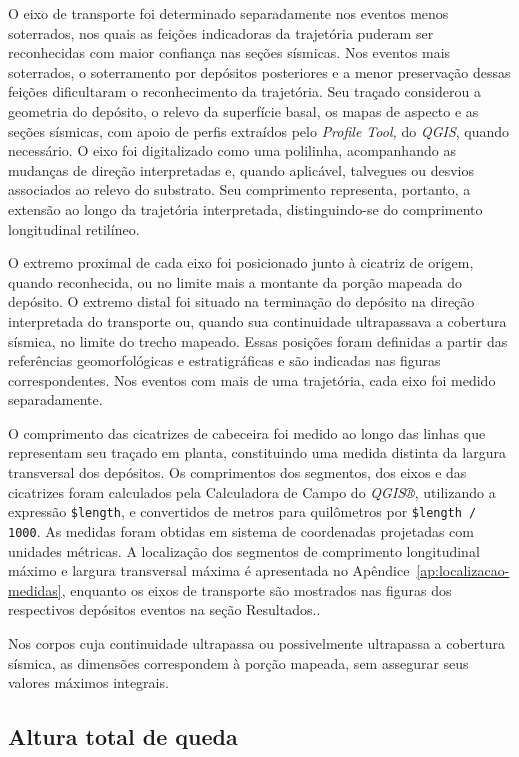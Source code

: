 O eixo de transporte foi determinado separadamente nos eventos menos soterrados, nos quais as feições indicadoras da trajetória puderam ser reconhecidas com maior confiança nas seções sísmicas. Nos eventos mais soterrados, o soterramento por depósitos posteriores e a menor preservação dessas feições dificultaram o reconhecimento da trajetória. Seu traçado considerou a geometria do depósito, o relevo da superfície basal, os mapas de aspecto e as seções sísmicas, com apoio de perfis extraídos pelo \textit{Profile Tool,} do \textit{QGIS}, quando necessário. O eixo foi digitalizado como uma polilinha, acompanhando as mudanças de direção interpretadas e, quando aplicável, talvegues ou desvios associados ao relevo do substrato. Seu comprimento representa, portanto, a extensão ao longo da trajetória interpretada, distinguindo-se do comprimento longitudinal retilíneo.

O extremo proximal de cada eixo foi posicionado junto à cicatriz de origem, quando reconhecida, ou no limite mais a montante da porção mapeada do depósito. O extremo distal foi situado na terminação do depósito na direção interpretada do transporte ou, quando sua continuidade ultrapassava a cobertura sísmica, no limite do trecho mapeado. Essas posições foram definidas a partir das referências geomorfológicas e estratigráficas e são indicadas nas figuras correspondentes. Nos eventos com mais de uma trajetória, cada eixo foi medido separadamente.

O comprimento das cicatrizes de cabeceira foi medido ao longo das linhas que representam seu traçado em planta, constituindo uma medida distinta da largura transversal dos depósitos. Os comprimentos dos segmentos, dos eixos e das cicatrizes foram calculados pela Calculadora de Campo do \textit{QGIS®}, utilizando a expressão \texttt{\$length}, e convertidos de metros para quilômetros por \texttt{\$length / 1000}. As medidas foram obtidas em sistema de coordenadas projetadas com unidades métricas. A localização dos segmentos de comprimento longitudinal máximo e largura transversal máxima é apresentada no Apêndice~\ref{ap:localizacao-medidas}, enquanto os eixos de transporte são mostrados nas figuras dos respectivos depósitos eventos na seção Resultados..

Nos corpos cuja continuidade ultrapassa ou possivelmente ultrapassa a cobertura sísmica, as dimensões correspondem à porção mapeada, sem assegurar seus valores máximos integrais.

\subsection{Altura total de queda}\label{sec:4-3-4}

